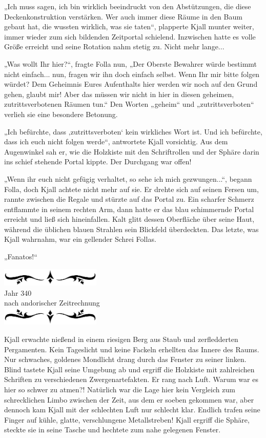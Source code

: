 \documentclass[10pt, a4paper, oneside]{book}
\newcommand{\az}[1]{%
    \begin{center}
        \includegraphics[width=180px]{Das Erbe des Wunderkindes/verzierung1.png}\\
        {\Huge #1} \\
        {nach andorischer Zeitrechnung}\\
        \includegraphics[width=180px]{Das Erbe des Wunderkindes/verzierung2.png}
    \end{center}
    \extramarks{}{#1 a.Z.}
}
\begin{document}
„Ich muss sagen, ich bin wirklich beeindruckt von den Abstützungen, die diese Deckenkonstruktion verstärken. Wer auch immer diese Räume in den Baum gebaut hat, die wussten wirklich, was sie taten“, plapperte Kjall munter weiter, immer wieder zum sich bildenden Zeitportal schielend. Inzwischen hatte es volle Größe erreicht und seine Rotation nahm stetig zu. Nicht mehr lange...

„Was wollt Ihr hier?“, fragte Folla nun, „Der Oberste Bewahrer würde bestimmt nicht einfach... nun, fragen wir ihn doch einfach selbst. Wenn Ihr mir bitte folgen würdet? Dem Geheimnis Eures Aufenthalts hier werden wir noch auf den Grund gehen, glaubt mir! Aber das müssen wir nicht in hier in diesen geheimen, zutrittsverbotenen Räumen tun.“ Den Worten „geheim“ und „zutrittsverboten“ verlieh sie eine besondere Betonung.

„Ich befürchte, dass ‚zutrittsverboten‘ kein wirkliches Wort ist. Und ich befürchte, dass ich euch nicht folgen werde“, antwortete Kjall vorsichtig. Aus dem Augenwinkel sah er, wie die Holzkiste mit den Schriftrollen und der Sphäre darin ins schief stehende Portal kippte. Der Durchgang war offen!

„Wenn ihr euch nicht gefügig verhaltet, so sehe ich mich gezwungen...“, begann Folla, doch Kjall achtete nicht mehr auf sie. Er drehte sich auf seinen Fersen um, rannte zwischen die Regale und stürzte auf das Portal zu. Ein scharfer Schmerz entflammte in seinem rechten Arm, dann hatte er das blau schimmernde Portal erreicht und ließ sich hineinfallen. Kalt glitt dessen Oberfläche über seine Haut, während die üblichen blauen Strahlen sein Blickfeld überdeckten. Das letzte, was Kjall wahrnahm, war ein gellender Schrei Follas.

„Fanatos!“\bigskip


\az{Jahr 340}


Kjall erwachte nießend in einem riesigen Berg aus Staub und zerfledderten Pergamenten. Kein Tageslicht und keine Fackeln erhellten das Innere des Raums. Nur schwaches, goldenes Mondlicht drang durch das Fenster zu seiner linken. Blind tastete Kjall seine Umgebung ab und ergriff die Holzkiste mit zahlreichen Schriften zu verschiedenen Zwergenartefakten. Er rang nach Luft. Warum war es hier so schwer zu atmen?! Natürlich war die Lage hier kein Vergleich zum schrecklichen Limbo zwischen der Zeit, aus dem er soeben gekommen war, aber dennoch kam Kjall mit der schlechten Luft nur schlecht klar. Endlich trafen seine Finger auf kühle, glatte, verschlungene Metallstreben! Kjall ergriff die Sphäre, steckte sie in seine Tasche und hechtete zum nahe gelegenen Fenster.
\end{document}
